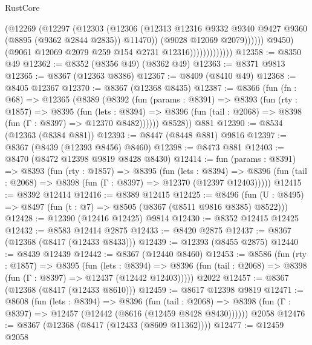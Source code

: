 \begin{lexlean}{RustCore}
\begin{coremodule}
                                  (@12269
                                    (@12297
                                      (@12303
                                        (@12306
                                          (@12313
                                            @12316
                                            @9332
                                            @9340
                                            @9427
                                            @9360
                                            (@8895 (@9362 @2844 @2835))
                                            @11470))
                                        (@9028 @12069 @2079))))))
                              @9450)
                            (@9061 @12069 @2079 @259 @154 @2731 @12316)))))))))))))
@12358 := @8350 @49
@12362 := @8352 (@8356 @49) (@8362 @49)
@12363 := @8371 @9813
@12365 := @8367 (@12363 @8386)
@12367 := @8409 (@8410 @49)
@12368 := @8405 @12367
@12370 := @8367 (@12368 @8435)
@12387 := @8366
    (fun (fn : @68) =>
    @12365
      (@8389
        (@8392
          (fun (params : @8391) =>
          @8393
            (fun (rty : @1857) =>
            @8395
              (fun (lets : @8394) =>
              @8396 (fun (tail : @2068) => @8398 (fun (Γ : @8397) => @12370 @8482))))))
        @8528))
    @881
@12390 := @8534 (@12363 (@8384 @881))
@12393 := @8447 (@8448 @881) @9816
@12397 := @8367 (@8439 (@12393 @8456) @8460)
@12398 := @8473 @881
@12403 := @8470 (@8472 @12398 @9819 @8428 @8430)
@12414 := fun (params : @8391) =>
  @8393
    (fun (rty : @1857) =>
    @8395
      (fun (lets : @8394) =>
      @8396 (fun (tail : @2068) => @8398 (fun (Γ : @8397) => @12370 (@12397 @12403)))))
@12415 := @8392 @12414
@12416 := @8389 @12415
@12425 := @8496 (fun (U : @8495) => @8497 (fun (t : @7) => @8505 (@8367 (@8511 @9816 @8385) @8522)))
@12428 := @12390 (@12416 @12425) @9814
@12430 := @8352 @12415 @12425
@12432 := @8583 @12414 @2875
@12433 := @8420 @2875
@12437 := @8367 (@12368 (@8417 (@12433 @8433)))
@12439 := @12393 (@8455 @2875)
@12440 := @8439 @12439
@12442 := @8367 (@12440 @8460)
@12453 := @8586
    (fun (rty : @1857) =>
    @8395
      (fun (lets : @8394) =>
      @8396 (fun (tail : @2068) => @8398 (fun (Γ : @8397) => @12437 (@12442 @12403)))))
    @2022
@12457 := @8367 (@12368 (@8417 (@12433 @8610)))
@12459 := @8617 @12398 @9819
@12471 := @8608
    (fun (lets : @8394) =>
    @8396
      (fun (tail : @2068) =>
      @8398 (fun (Γ : @8397) => @12457 (@12442 (@8616 (@12459 @8428 @8430))))))
    @2058
@12476 := @8367 (@12368 (@8417 (@12433 (@8609 @11362))))
@12477 := @12459 @2058

\end{coremodule}
\end{lexlean}
